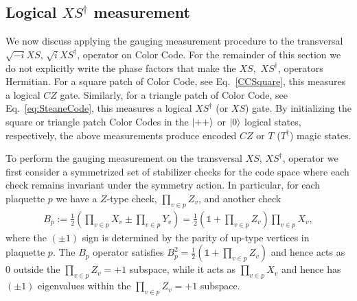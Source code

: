 \subsection{Logical $XS^\dagger$ measurement}

We now discuss applying the gauging measurement procedure to the transversal $\sqrt{-i}XS$, $\sqrt{i}XS^\dagger$, operator on Color Code. 
For the remainder of this section we do not explicitly write the phase factors that make the $XS,$ $XS^\dagger$, operators Hermitian. 
For a square patch of Color Code, see Eq.~\eqref{CCSquare}, this measures a logical $CZ$ gate. 
Similarly, for a triangle patch of Color Code, see Eq.~\eqref{eq:SteaneCode}, this measures a logical $XS^\dagger$ (or $XS$) gate. 
By initializing the square or triangle patch Color Codes in the $\ket{++}$ or $\ket{0}$ logical states, respectively, the above measurements produce encoded $CZ$ or $T$ ($T^\dagger$) magic states. 


To perform the gauging measurement on the transversal $XS$, $XS^\dagger$, operator we first consider a symmetrized set of stabilizer checks for the code space where each check remains invariant under the symmetry action. 
In particular, for each plaquette $p$ we have a $Z$-type check, $\prod_{v\in p} Z_v$, and another check
\begin{align}
    B_p:={\frac{1}{2}(\prod_{v\in p} X_v \pm \prod_{v\in p} Y_v)=\frac{1}{2} (\mathds{1} + \prod_{v \in p} Z_v ) \prod_{v\in p} X_v } ,
\end{align}
where the $(\pm 1)$ sign is determined by the parity of up-type vertices in plaquette $p$. 
The $B_p$ operator satisfies ${B_p^2=\frac{1}{2} (\mathds{1} + \prod_{v \in p} Z_v )}$ and hence acts as 0 outside the $\prod_{v \in p} Z_v = +1$ subspace, while it acts as $\prod_{v\in p} X_v$ and hence has $(\pm 1)$ eigenvalues within the $\prod_{v \in p} Z_v = +1$  subspace. 

